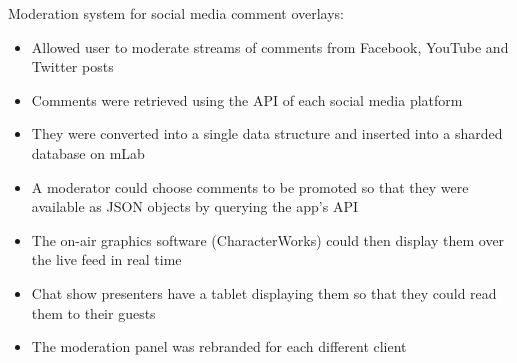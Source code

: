 \item Moderation system for social media comment overlays:
\begin{itemize}
    \item Allowed user to moderate streams of comments from Facebook, YouTube and Twitter posts
    \item Comments were retrieved using the API of each social media platform
    \item They were converted into a single data structure and inserted into a sharded database on mLab
    \item A moderator could choose comments to be promoted so that they were available as JSON objects by querying the app's API
    \item The on-air graphics software (CharacterWorks) could then display them over the live feed in real time
    \item Chat show presenters have a tablet displaying them so that they could read them to their guests
    \item The moderation panel was rebranded for each different client
\end{itemize}
